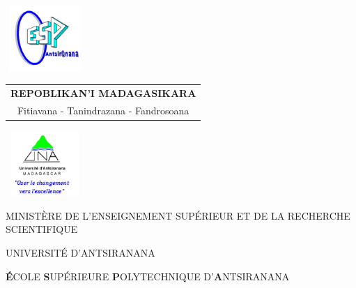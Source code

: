 \begin{titlepage}
	\begin{minipage}{0.15\linewidth}		
		\begin{flushleft}
			\includegraphics[width=3cm,height=2.5cm]{./img/espa.png}
		\end{flushleft}
	\end{minipage}
	\hfill
	\begin{minipage}{0.45\linewidth}		
		\begin{center}
			\begin{tabular}{c}
				\textbf{REPOBLIKAN’I MADAGASIKARA}  \\
				\small{Fitiavana - Tanindrazana - Fandrosoana} \\	
			\end{tabular}
		\end{center}		
	\end{minipage}
	\hfill
	\begin{minipage}{0.20\linewidth}
		\begin{flushright}
			\includegraphics[width=3cm,height=2.5cm]{./img/una.png}
		\end{flushright}
	\end{minipage}
	
	\vfill
	\begin{center}
		\begin{large}
			\Large{MINISTÈRE DE L'ENSEIGNEMENT SUPÉRIEUR ET DE LA RECHERCHE SCIENTIFIQUE} \\
		\end{large}
	\end{center}
	
	\begin{center}
		\begin{large}
			\Large{UNIVERSITÉ D’ANTSIRANANA} \\
		\end{large}
	\end{center}
	
	\begin{center}
		\begin{large}
			\large{\textbf{É}COLE \textbf{S}UPÉRIEURE \textbf{P}OLYTECHNIQUE D'\textbf{A}NTSIRANANA} \
		\end{large}
	\end{center}
	

\end{titlepage}
